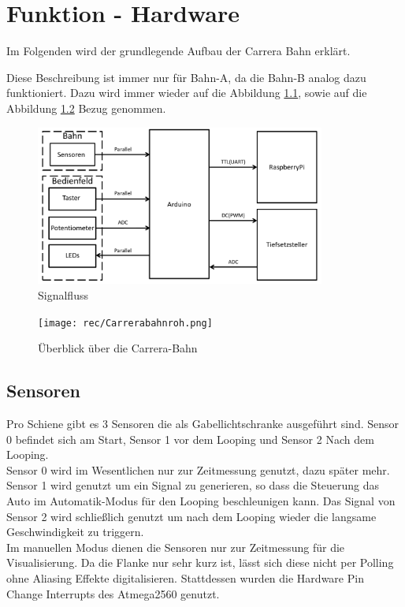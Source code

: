 \documentclass[a4paper, 11pt]{report}
\begin{document}
\chapter{Funktion - Hardware}
	Im Folgenden wird der grundlegende Aufbau der Carrera Bahn erklärt.

	Diese Beschreibung ist immer nur für Bahn-A, da die
	Bahn-B analog dazu funktioniert. Dazu wird immer wieder auf die Abbildung \ref{img:signalfluss}, sowie auf die \\Abbildung
	\ref{img:carrerakomplett} Bezug genommen.
	\begin{figure}[ht]
		\centering
		\includegraphics[width=0.85\textwidth]{rec/signalfluss.pdf}
		\caption{Signalfluss}
		\label{img:signalfluss}
	\end{figure}
	\begin{figure}[ht]
	\centering
	\texttt{[image: rec/Carrerabahnroh.png]}
	\caption{Überblick über die Carrera-Bahn}
	\label{img:carrerakomplett}
	\end{figure}
	\newpage

	\section{Sensoren}
		Pro Schiene gibt es 3 Sensoren die als Gabellichtschranke ausgeführt sind. Sensor 0 befindet sich am Start, Sensor 1 vor dem Looping und 		Sensor 2 Nach dem Looping.\\

		Sensor 0 wird im Wesentlichen nur zur Zeitmessung genutzt, dazu später mehr.
		Sensor 1 wird genutzt um ein Signal zu generieren, so dass die Steuerung das Auto im Automatik-Modus für den Looping beschleunigen kann. 		Das Signal von Sensor 2 wird schließlich genutzt um nach dem Looping wieder die langsame Geschwindigkeit zu triggern.\\
		Im manuellen Modus dienen die Sensoren nur zur Zeitmessung für die Visualisierung.
		Da die Flanke nur sehr kurz ist, lässt sich diese nicht per Polling ohne Aliasing Effekte digitalisieren. Stattdessen wurden die Hardware 		Pin Change Interrupts des Atmega2560 genutzt.
\end{document}
